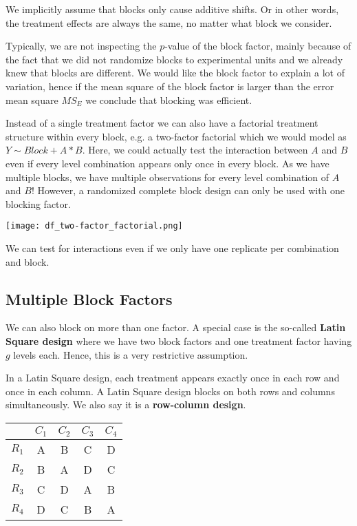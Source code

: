 We implicitly assume that blocks only cause additive shifts. Or in other words, the treatment effects are always the same, no matter what block we consider.\medskip

Typically, we are not inspecting the $p$-value of the block factor, mainly because of the fact that we did not randomize blocks to experimental units and we already knew that blocks are different. We would like the block factor to explain a lot of variation, hence if the mean square of the block factor is larger than the error mean square $MS_E$ we conclude that blocking was efficient. \medskip

Instead of a single treatment factor we can also have a factorial treatment structure within every block, e.g. a two-factor factorial which we would model as $Y \sim Block + A * B$. Here, we could actually test the interaction between $A$ and $B$ even if every level combination appears only once in every block. As we have multiple blocks, we have multiple observations for every level combination of $A$ and $B$! However, a randomized complete block design can only be used with one blocking factor.

\begin{center}
	\texttt{[image: df\_two-factor\_factorial.png]}
\end{center}

We can test for interactions even if we only have one replicate per combination and block.

\subsection{Multiple Block Factors}

We can also block on more than one factor. A special case is the so-called \textbf{Latin Square design} where we have two block factors and one treatment factor having $g$ levels each. Hence, this is a very restrictive assumption. \medskip

In a Latin Square design, each treatment appears exactly once in each row and once in each column. A Latin Square design blocks on both rows and columns simultaneously. We also say it is a \textbf{row-column design}.
\begin{center}
	\begin{tabular}{c c c c c}
		 & $C_1$ & $C_2$ & $C_3$ & $C_4$\\ \hline
		 $R_1$ & A & B & C & D \\ \hline
		 $R_2$ & B & A & D & C \\ \hline
		 $R_3$ & C & D & A & B \\ \hline
		 $R_4$ & D & C & B & A \\ \hline
	\end{tabular}
\end{center}

